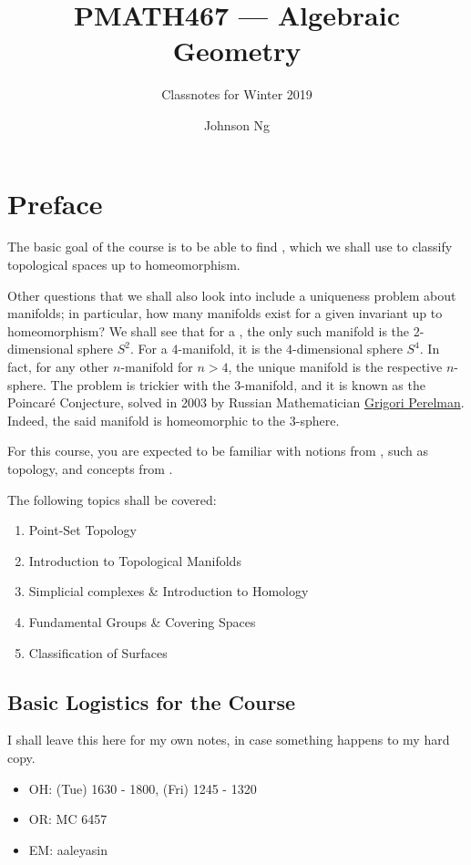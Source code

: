 \documentclass[notoc,notitlepage]{tufte-book}
\title{PMATH467 --- Algebraic Geometry}
\author{Johnson Ng}
\subtitle{Classnotes for Winter 2019}
\begin{document}


\chapter*{Preface}%
\label{chp:preface}

The basic goal of the course is to be able to find , which we shall use to classify topological spaces up to homeomorphism.

Other questions that we shall also look into include a uniqueness problem about manifolds; in particular, how many manifolds exist for a given invariant up to homeomorphism? We shall see that for a , the only such manifold is the 2-dimensional sphere $S^2$. For a $4$-manifold, it is the $4$-dimensional sphere $S^4$. In fact, for any other $n$-manifold for $n > 4$, the unique manifold is the respective $n$-sphere. The problem is trickier with the $3$-manifold, and it is known as the Poincar\'{e} Conjecture, solved in 2003 by Russian Mathematician \href{https://en.wikipedia.org/wiki/Grigori_Perelman}{Grigori Perelman}. Indeed, the said manifold is homeomorphic to the $3$-sphere.

For this course, you are expected to be familiar with notions from , such as topology, and concepts from .

The following topics shall be covered:
\begin{enumerate}
  \item Point-Set Topology
  \item Introduction to Topological Manifolds
  \item Simplicial complexes \& Introduction to Homology
  \item Fundamental Groups \& Covering Spaces
  \item Classification of Surfaces
\end{enumerate}

\section*{Basic Logistics for the Course}%

I shall leave this here for my own notes, in case something happens to my hard copy.

\begin{itemize}
  \item OH: (Tue) 1630 - 1800, (Fri) 1245 - 1320
  \item OR: MC 6457
  \item EM: aaleyasin
\end{itemize}
\end{document}
